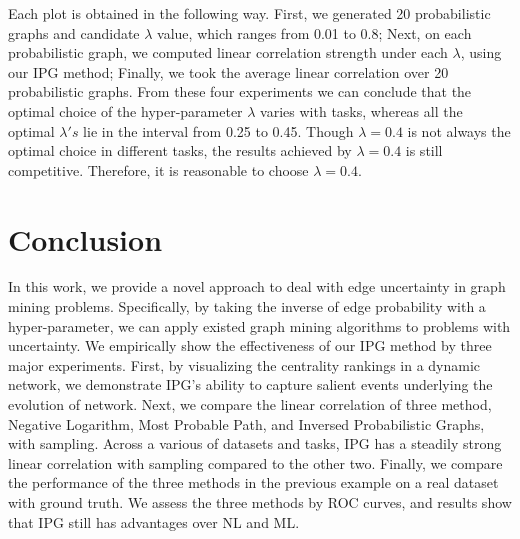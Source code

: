 \documentclass[\main/thesis.tex]{subfiles}
\begin{document}
Each plot is obtained in the following way. First, we generated 20 probabilistic graphs and candidate $\lambda$ value, which ranges from 0.01 to 0.8; Next, on each probabilistic graph, we computed linear correlation strength under each $\lambda$, using our IPG method; Finally, we took the average linear correlation over 20 probabilistic graphs. From these four experiments we can conclude that the optimal choice of the hyper-parameter $\lambda$ varies with tasks, whereas all the optimal $\lambda's$ lie in the interval from 0.25 to 0.45. Though $\lambda=0.4$ is not always the optimal choice in different tasks, the results achieved by $\lambda=0.4$ is still competitive. Therefore, it is reasonable to choose $\lambda=0.4$.

\section{Conclusion}
In this work, we provide a novel approach to deal with edge uncertainty in graph mining problems. Specifically, by taking the inverse of edge probability with a hyper-parameter, we can apply existed graph mining algorithms to problems with uncertainty. We empirically show the effectiveness of our IPG method by three major experiments. First, by visualizing the centrality rankings in a dynamic network, we demonstrate IPG's ability to capture salient events underlying the evolution of network. Next, we compare the linear correlation of three method, Negative Logarithm, Most Probable Path, and Inversed Probabilistic Graphs, with sampling. Across a various of datasets and tasks, IPG has a steadily strong linear correlation with sampling compared to the other two. Finally, we compare the performance of the three methods in the previous example on a real dataset with ground truth. We assess the three methods by ROC curves, and results show that IPG still has advantages over NL and ML. 
\end{document}
